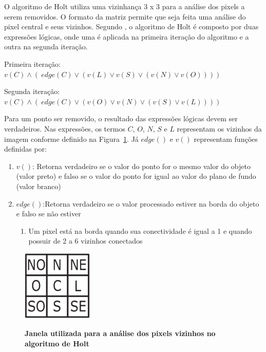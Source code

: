 \documentclass[12pt,oneside,a4paper,english,french,spanish,brazil,]{abntex2}
\begin{document}
O algoritmo de Holt \cite{holt:1987} utiliza uma vizinhança 3 x 3 para a análise dos pixels a serem removidos. O formato da matriz permite que seja feita uma análise do pixel central e seus vizinhos. Segundo \citet{guilherme:2007}, o algoritmo de Holt é composto por duas expressões lógicas, onde uma é aplicada na primeira iteração do algoritmo e a outra na segunda iteração.

Primeira iteração: 
\(v(C) \wedge (~ edge(C) \vee (v(L) \vee v(S) \vee (v(N) \vee v(O))))\)

Segunda iteração:
\(v(C) \wedge (~ edge(C) \vee (v(O) \vee v(N) \vee (v(S) \vee v(L))))\)

Para um ponto ser removido, o resultado das expressões lógicas devem ser verdadeiros. Nas expressões, os termos \(C\), \(O\), \(N\), \(S\) e \(L\) representam os vizinhos da imagem conforme definido na Figura~\ref{fig:PDI_Holt_1}. Já \(edge()\) e \(v()\) representam funções definidas por:
\begin{enumerate}
\item \(v()\): Retorna verdadeiro se o valor do ponto for o mesmo valor do objeto (valor preto) e falso se o valor do ponto for igual ao valor do plano de fundo (valor branco)
\item \(edge()\):Retorna verdadeiro se o valor processado estiver na borda do objeto e falso se não estiver
\begin{enumerate}[label*=\roman*.]
    \item Um pixel está na borda quando sua conectividade é igual a 1 e quando possuir de 2 a 6 vizinhos conectados
  \end{enumerate}
\end{enumerate}

\begin{figure}[ht]
\centering
\caption{\textbf{Janela utilizada para a análise dos pixels vizinhos no algoritmo de Holt}}
\includegraphics[width=0.3\textwidth]{imagens/PDI_Holt_1.PNG}
\label{fig:PDI_Holt_1}
\end{figure}

\end{document}
